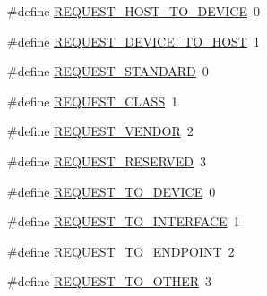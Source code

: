 \begin{DoxyCompactItemize}
\item 
\#define \hyperlink{group__USBD__Core_ga8d90abb0515c0c9cd7c80480f1ebe7d3}{R\-E\-Q\-U\-E\-S\-T\-\_\-\-H\-O\-S\-T\-\_\-\-T\-O\-\_\-\-D\-E\-V\-I\-C\-E}~0
\item 
\#define \hyperlink{group__USBD__Core_gaf8f8eae5ae324d7d3e1344e97e23b20f}{R\-E\-Q\-U\-E\-S\-T\-\_\-\-D\-E\-V\-I\-C\-E\-\_\-\-T\-O\-\_\-\-H\-O\-S\-T}~1
\end{DoxyCompactItemize}
\begin{DoxyCompactItemize}
\item 
\#define \hyperlink{group__USBD__Core_ga1dd6ef57678e7af95d835049d5b355b9}{R\-E\-Q\-U\-E\-S\-T\-\_\-\-S\-T\-A\-N\-D\-A\-R\-D}~0
\item 
\#define \hyperlink{group__USBD__Core_gafd24e03239e2df9e6d9c6cbcd53c1337}{R\-E\-Q\-U\-E\-S\-T\-\_\-\-C\-L\-A\-S\-S}~1
\item 
\#define \hyperlink{group__USBD__Core_ga40131e4daec200a7d931c2b26e43d27f}{R\-E\-Q\-U\-E\-S\-T\-\_\-\-V\-E\-N\-D\-O\-R}~2
\item 
\#define \hyperlink{group__USBD__Core_ga63cb1192a7cd205455bddd302f67c915}{R\-E\-Q\-U\-E\-S\-T\-\_\-\-R\-E\-S\-E\-R\-V\-E\-D}~3
\end{DoxyCompactItemize}
\begin{DoxyCompactItemize}
\item 
\#define \hyperlink{group__USBD__Core_gaf89871a0b4aa9411e09a9961de76e76f}{R\-E\-Q\-U\-E\-S\-T\-\_\-\-T\-O\-\_\-\-D\-E\-V\-I\-C\-E}~0
\item 
\#define \hyperlink{group__USBD__Core_ga0e5e473281fc9c1ee1ea446823c02623}{R\-E\-Q\-U\-E\-S\-T\-\_\-\-T\-O\-\_\-\-I\-N\-T\-E\-R\-F\-A\-C\-E}~1
\item 
\#define \hyperlink{group__USBD__Core_ga4c4571ca0bf6b462bd8954a95456561c}{R\-E\-Q\-U\-E\-S\-T\-\_\-\-T\-O\-\_\-\-E\-N\-D\-P\-O\-I\-N\-T}~2
\item 
\#define \hyperlink{group__USBD__Core_gad1f005d9ae04da7324d465a86e489af5}{R\-E\-Q\-U\-E\-S\-T\-\_\-\-T\-O\-\_\-\-O\-T\-H\-E\-R}~3
\end{DoxyCompactItemize}
